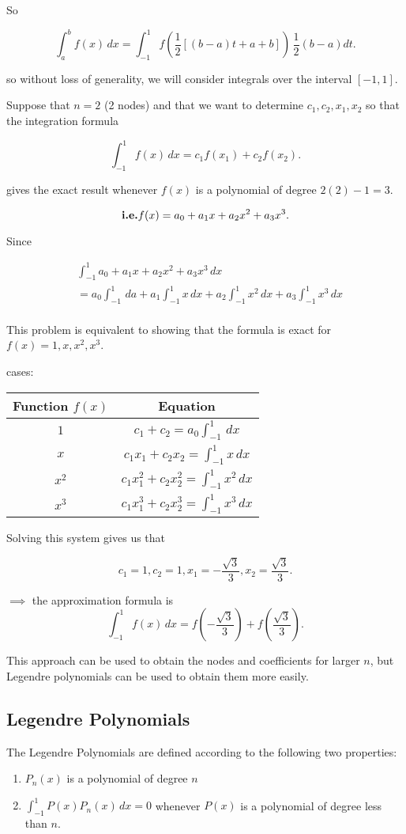 So 

\[
  \int_{a}^{b} f(x) \, dx = \int_{-1}^{1} f(\frac{1}{2}[(b-a)t + a+b]) \,
  \frac{1}{2}(b-a)dt
.\]

so without loss of generality, we will consider integrals over the interval $[-1,1]$.

Suppose that $n=2$ (2 nodes) and that we want to determine $c_1, c_2, x_1, x_2$
so that the integration formula

\[
\int_{-1}^{1} f(x) \, dx = c_1 f(x_1) + c_2 f(x_2)
.\]

gives the exact result whenever $f(x)$ is a polynomial of degree $2(2)-1 =3$.

\[
\textbf{i.e.} f(x) = a_0 + a_1 x + a_2 x^2 + a_3 x^3
.\]

Since 

\begin{align*}
&\int_{-1}^{1} a_0 + a_1 x + a_2 x^2 + a_3x^3 \, dx  \\
&= a_0 \int_{-1}^{1}  \, da + a_1 \int_{-1}^{1} x \, dx + a_2 \int_{-1}^{1} x^2 \, dx + a_3 \int_{-1}^{1} x^3 \, dx \\
\end{align*}

This problem is equivalent to showing that the formula is exact for $f(x) = 1,
x, x^2, x^3$.

cases:

\begin{center}
  \begin{tabular}{c|c}
    Function $f(x)$ & Equation \\
    \hline
    $1$ & $c_1 + c_2 = a_0 \int_{-1}^{1} \, dx$ \\
    $x$ & $c_1x_1 + c_2x_2 = \int_{-1}^{1} x \, dx$ \\
    $x^2$ & $c_1x_1^2 + c_2x_2^2 = \int_{-1}^{1} x^2 \, dx$ \\
    $x^3$ & $c_1x_1^3 + c_2x_2^3 = \int_{-1}^{1} x^3 \, dx$ \\
  \end{tabular}
\end{center}

Solving this system gives us that

\[
c_1 = 1, c_2 = 1, x_1 = - \frac{\sqrt{3}}{3}, x_2 = \frac{\sqrt{3}}{3}
.\]

$\implies$ the approximation formula is 
\[
  \int_{-1}^{1} f(x) \, dx = f\left(-\frac{\sqrt{3}}{3}\right) +
  f\left(\frac{\sqrt{3}}{3}\right)
.\]

This approach can be used to obtain the nodes and coefficients for larger $n$,
but Legendre polynomials can be used to obtain them more easily.

\subsection{Legendre Polynomials}

The Legendre Polynomials are defined according to the following two properties:

\begin{enumerate}
\item $P_n(x)$ is a polynomial of degree $n$
\item $\int_{-1}^{1} P(x)P_n(x) \, dx = 0$ whenever $P(x)$ is a polynomial of
  degree less than $n$.
\end{enumerate}

